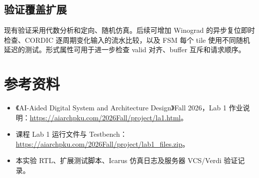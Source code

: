 \documentclass[
  10pt,
  a4paper,
]{article}
\providecommand{\tightlist}{%
  \setlength{\itemsep}{0pt}\setlength{\parskip}{0pt}}
\begin{document}
\subsection{验证覆盖扩展}\label{ux9a8cux8bc1ux8986ux76d6ux6269ux5c55}

现有验证采用代数分析和定向、随机仿真。后续可增加 Winograd
的异步复位即时检查、CORDIC 逐周期变化输入的流水比较，以及 FSM 每个 tile
使用不同随机延迟的测试。形式属性可用于进一步检查 valid 对齐、buffer
互斥和请求顺序。

\section{参考资料}\label{ux53c2ux8003ux8d44ux6599}

\begin{itemize}
\tightlist
\item
  《AI-Aided Digital System and Architecture Design》Fall 2026，Lab 1
  作业说明：\url{https://aiarchpku.com/2026Fall/project/la1.html}。
\item
  课程 Lab 1 运行文件与
  Testbench：\url{https://aiarchpku.com/2026Fall/project/lab1_files.zip}。
\item
  本实验 RTL、扩展测试脚本、Icarus 仿真日志及服务器 VCS/Verdi 验证记录。
\end{itemize}
\end{document}
